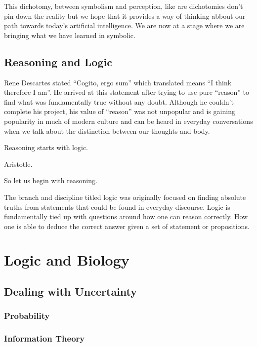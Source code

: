 \documentclass[]{book}
\theoremstyle{definition}
\theoremstyle{definition}
\theoremstyle{definition}
\theoremstyle{remark}
\begin{document}
This dichotomy, between symbolism and perception, like are dichotomies
don't pin down the reality but we hope that it provides a way of
thinking abbout our path towards today's artificial intelligence. We are
now at a stage where we are bringing what we have learned in symbolic.

\section{Reasoning and Logic}\label{reasoning-and-logic}

Rene Descartes stated ``Cogito, ergo sum'' which translated means ``I
think therefore I am''. He arrived at this statement after trying to use
pure ``reason'' to find what was fundamentally true without any doubt.
Although he couldn't complete his project, his value of ``reason'' was
not unpopular and is gaining popularity in much of modern culture and
can be heard in everyday conversations when we talk about the
distinction between our thoughts and body.

Reasoning starts with logic.

Aristotle.

So let us begin with reasoning.

The branch and discipline titled logic was originally focused on finding
absolute truths from statements that could be found in everyday
discourse. Logic is fundamentally tied up with questions around how one
can reason correctly. How one is able to deduce the correct answer given
a set of statement or propositions.

\chapter{Logic and Biology}\label{logic-and-biology}

\section{Dealing with Uncertainty}\label{dealing-with-uncertainty}

\subsection{Probability}\label{probability}

\subsection{Information Theory}\label{information-theory}
\end{document}
